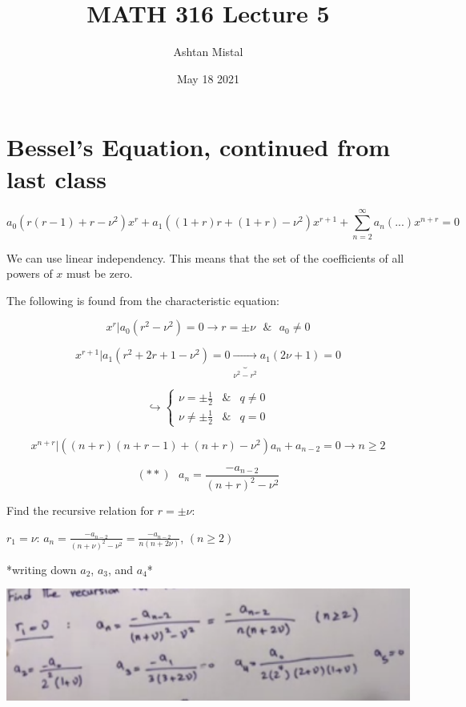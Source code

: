 \documentclass{article}
\title{MATH 316 Lecture 5}
\author{Ashtan Mistal}
\date{May 18 2021}
\begin{document}
\ifstandalone
\maketitle
\fi

\graphicspath{{./Lecture05/}}

\section{Bessel's Equation, continued from last class}

$$a_0 (r(r-1) + r - \nu^2) x^r + a_1 \left((1+r)r + (1+r) - \nu^2 \right) x^{r+1} + \sum_{n = 2}^\infty a_n \left(... \right) x^{n+r} = 0$$

We can use linear independency. This means that the set of the coefficients of all powers of $x$ must be zero.

The following is found from the characteristic equation:

$$x^r | a_0 (r^2 - \nu^2) = 0 \longrightarrow r = \pm \nu \text{ }\& \text{ } a_0 \neq 0$$

$$x^{r+1} | a_1 \left(r^2 + 2r + 1 - \nu^2 \right) = 0 \underbrace{\longrightarrow}_{\nu^2 - r^2} a_1 (2 \nu + 1) = 0$$

$$\hookrightarrow \left\{ \begin{matrix} \nu = \pm \frac{1}{2} &  \& & q \neq 0 \\ \nu \neq \pm \frac{1}{2} & \& & q = 0 \end{matrix} \right.$$

$$x^{n+r} | \left((n+r) (n+r-1) + (n+r) - \nu^2 \right) a_n + a_{n-2} = 0 \longrightarrow n \geq 2$$

$$(**)\text{ } a_n = \frac{-a_{n-2}}{(n+r)^2 - \nu^2}$$

Find the recursive relation for $r = \pm \nu$:

$r_1 = \nu$: $a_n = \frac{-a_{n-2}}{(n+\nu)^2 - \nu^2} = \frac{-a_{n-2}}{n(n + 2 \nu)}$,  $(n \geq 2)$

*writing down $a_2$, $a_3$, and $a_4$*

\includegraphics[width = 0.8 \textwidth]{image2.png}

\hfill
\end{document}
